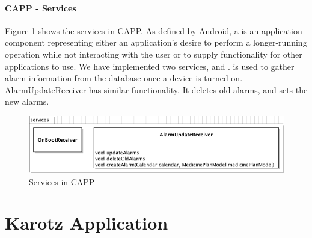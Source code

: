 % 
%  


\paragraph{CAPP - Services}
Figure \ref{fig:class-diagram-child-services} shows the services in CAPP.
As defined by Android\cite{androidservice}, a  is an application component representing either an application's desire to perform a longer-running operation while not interacting with the 
user or to supply functionality for other applications to use.
We have implemented two services,  and .  is used to gather alarm information from the database once a device is turned on.
AlarmUpdateReceiver has similar functionality. It deletes old alarms, and sets the new alarms.
\clearpage{}
\begin{figure}
	\centering
		\includegraphics[width = \linewidth]{Pictures/ArchPictures/capparchpictures/capp_services.png}
	\caption{Services in CAPP}
	\label{fig:class-diagram-child-services}
\end{figure}

\section{Karotz Application}

